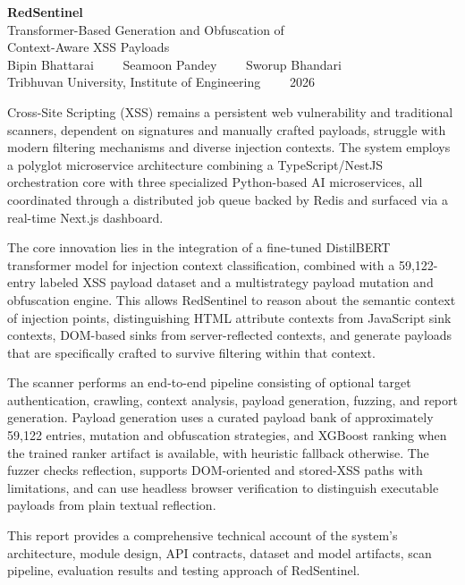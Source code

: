 \documentclass[a4paper,11pt]{article}
\begin{document}
\begin{center}
{\LARGE\textbf{RedSentinel}}\\[6pt]
{\large Transformer-Based Generation and Obfuscation of\\[3pt]
Context-Aware XSS Payloads}\\[14pt]
Bipin Bhattarai \ \ \textperiodcentered \ \ Seamoon Pandey \ \ \textperiodcentered \ \ Sworup Bhandari\\[5pt]
{\color{rulegray}\small Tribhuvan University, Institute of Engineering \ \ \textperiodcentered \ \ 2026}
\end{center}

\vspace{18pt}

Cross-Site Scripting (XSS) remains a persistent web vulnerability and traditional scanners, dependent on signatures and manually crafted payloads, struggle with modern filtering mechanisms and diverse injection contexts. The system employs a polyglot microservice architecture combining a TypeScript/NestJS orchestration core with three specialized Python-based AI microservices, all coordinated through a distributed job queue backed by Redis and surfaced via a real-time Next.js dashboard.

The core innovation lies in the integration of a fine-tuned DistilBERT transformer model for injection context classification, combined with a 59,122-entry labeled XSS payload dataset and a multistrategy payload mutation and obfuscation engine. This allows RedSentinel to reason about the semantic context of injection points, distinguishing HTML attribute contexts from JavaScript sink contexts, DOM-based sinks from server-reflected contexts, and generate payloads that are specifically crafted to survive filtering within that context.

The scanner performs an end-to-end pipeline consisting of optional target authentication, crawling, context analysis, payload generation, fuzzing, and report generation. Payload generation uses a curated payload bank of approximately 59,122 entries, mutation and obfuscation strategies, and XGBoost ranking when the trained ranker artifact is available, with heuristic fallback otherwise. The fuzzer checks reflection, supports DOM-oriented and stored-XSS paths with limitations, and can use headless browser verification to distinguish executable payloads from plain textual reflection.

This report provides a comprehensive technical account of the system's architecture, module design, API contracts, dataset and model artifacts, scan pipeline, evaluation results and testing approach of RedSentinel.

\vspace{14pt}

\end{document}
